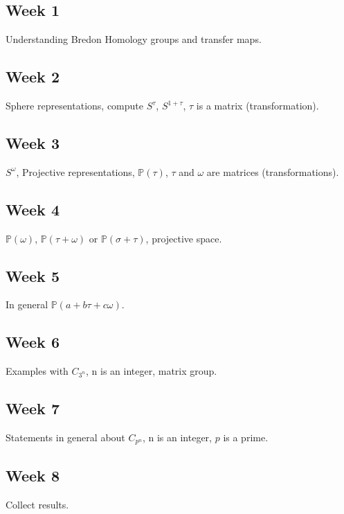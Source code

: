 \documentclass[12pt]{article}
\begin{document}
\subsection{Week 1}
Understanding Bredon Homology groups and transfer maps.

\subsection{Week 2}
Sphere representations, compute $S^{\tau}$, $S^{1+\tau}$, $\tau$ is a matrix (transformation).

\subsection{Week 3}
$S^{\omega}$, Projective representations, $\mathbb{P}(\tau)$, $\tau$ and $\omega$ are matrices (transformations).

\subsection{Week 4}
$\mathbb{P}(\omega)$, $\mathbb{P}(\tau + \omega)$ or $\mathbb{P}(\sigma + \tau)$, projective space.

\subsection{Week 5}
In general $\mathbb{P}(a + b\tau + c\omega)$.

\subsection{Week 6}
Examples with $C_{3^n}$, n is an integer, matrix group.

\subsection{Week 7}
Statements in general about $C_{p^n}$, n is an integer, $p$ is a prime.

\subsection{Week 8}
Collect results.



\end{document}

